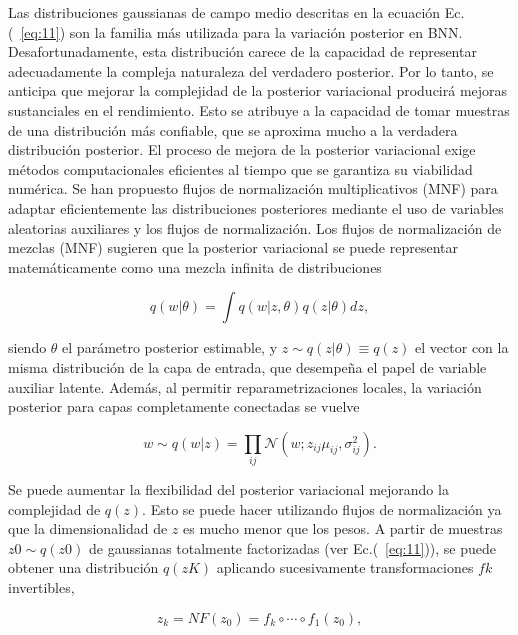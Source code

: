 \documentclass[10pt, oneside, a4paper]{article}
\begin{document}
	Las distribuciones gaussianas de campo medio descritas en la ecuación Ec.(~\ref{eq:11}) son la familia más utilizada para la variación posterior en BNN. Desafortunadamente, esta distribución carece de la capacidad de representar adecuadamente la compleja naturaleza del verdadero posterior. Por lo tanto, se anticipa que mejorar la complejidad de la posterior variacional producirá mejoras sustanciales en el rendimiento. Esto se atribuye a la capacidad de tomar muestras de una distribución más confiable, que se aproxima mucho a la verdadera distribución posterior. El proceso de mejora de la posterior variacional exige métodos computacionales eficientes al tiempo que se garantiza su viabilidad numérica. Se han propuesto flujos de normalización multiplicativos (MNF) para adaptar eficientemente las distribuciones posteriores mediante el uso de variables aleatorias auxiliares y los flujos de normalización. Los flujos de normalización de mezclas (MNF) sugieren que la posterior variacional se puede representar matemáticamente como una mezcla infinita de distribuciones \cite{mnf}
	
	\begin{equation} \label{eq:12}
	q(w|\theta) = \int q(w|z, \theta) q(z|\theta) dz,
	\end{equation}	

	siendo $\theta$ el parámetro posterior estimable, y $z \sim q(z| \theta) \equiv q(z)$ el vector con la misma distribución de la capa de entrada, que desempeña el papel de variable auxiliar latente. Además, al permitir reparametrizaciones locales, la variación posterior para capas completamente conectadas se vuelve
	
	\begin{equation} \label{eq:13}
	w \sim q(w|z) = \prod_{ij} \mathcal{N} (w;z_{ij}\mu_{ij}, \sigma^{2}_{ij}).
	\end{equation}	

	Se puede aumentar la flexibilidad del posterior variacional mejorando la complejidad de $q(z)$. Esto se puede hacer utilizando flujos de normalización ya que la dimensionalidad de $z$ es mucho menor que los pesos. A partir de muestras $z{0} \sim q(z{0})$ de gaussianas totalmente factorizadas (ver Ec.(~\ref{eq:11})), se puede obtener una distribución $q(z{K})$ aplicando sucesivamente transformaciones $f{k}$ invertibles,
	
	\begin{equation} \label{eq:14}
	z_{k} = NF(z_{0}) = f_{k} \circ \cdots \circ f_{1}(z_{0}),
	\end{equation}	
\end{document}

